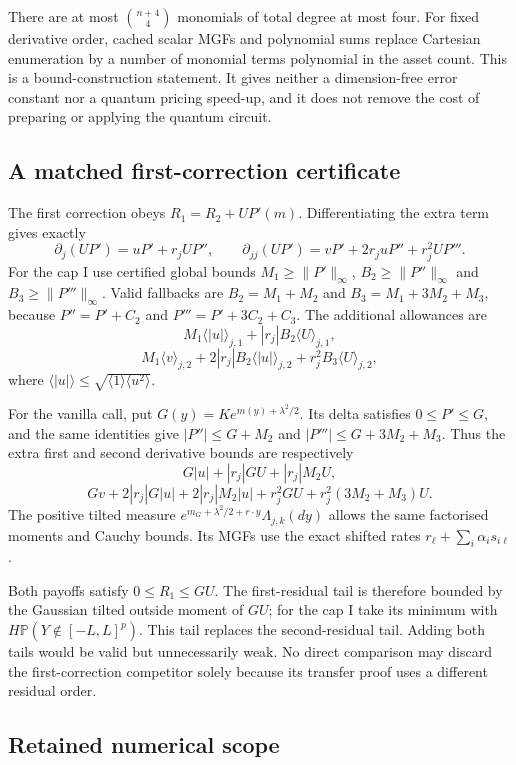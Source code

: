 There are at most $\binom{n+4}{4}$ monomials of total degree at most four.
For fixed derivative order, cached scalar MGFs and polynomial sums replace
Cartesian enumeration by a number of monomial terms polynomial in the
asset count. This is a bound-construction statement. It gives neither a
dimension-free error constant nor a quantum pricing speed-up, and it
does not remove the cost of preparing or applying the quantum circuit.

\subsection{A matched first-correction certificate}

The first correction obeys $R_1=R_2+UP'(m)$. Differentiating the extra
term gives exactly
\[
 \partial_j(UP')=uP'+r_jUP'',\qquad
 \partial_{jj}(UP')=vP'+2r_juP''+r_j^2UP'''.
\]
For the cap I use certified global bounds $M_1\geq\|P'\|_\infty$,
$B_2\geq\|P''\|_\infty$ and $B_3\geq\|P'''\|_\infty$. Valid
fallbacks are $B_2=M_1+M_2$ and $B_3=M_1+3M_2+M_3$, because
$P''=P'+C_2$ and $P'''=P'+3C_2+C_3$. The additional allowances are
\[
 M_1\langle|u|\rangle_{j,1}+|r_j|B_2\langle U\rangle_{j,1},
\]
\[
 M_1\langle v\rangle_{j,2}+2|r_j|B_2\langle|u|\rangle_{j,2}
                   +r_j^2B_3\langle U\rangle_{j,2},
\]
where $\langle|u|\rangle\leq
\sqrt{\langle1\rangle\langle u^2\rangle}$.

For the vanilla call, put $G(y)=K e^{m(y)+\lambda^2/2}$. Its delta
satisfies $0\leq P'\leq G$, and the same identities give
$|P''|\leq G+M_2$ and $|P'''|\leq G+3M_2+M_3$. Thus the extra
first and second derivative bounds are respectively
\[
 G|u|+|r_j|GU+|r_j|M_2U,
\]
\[
 Gv+2|r_j|G|u|+2|r_j|M_2|u|
             +r_j^2GU+r_j^2(3M_2+M_3)U.
\]
The positive tilted measure $e^{m_G+\lambda^2/2+r\cdot y}
\Lambda_{j,k}(dy)$ allows the same factorised moments and Cauchy bounds.
Its MGFs use the exact shifted rates $r_\ell+\sum_i\alpha_is_{i\ell}$.

Both payoffs satisfy $0\leq R_1\leq GU$. The first-residual tail is
therefore bounded by the Gaussian tilted outside moment of $GU$;
for the cap I take its minimum with $H\mathbb P(Y\notin[-L,L]^p)$.
This tail replaces the second-residual tail. Adding both tails would
be valid but unnecessarily weak. No direct comparison may discard the
first-correction competitor solely because its transfer proof uses a
different residual order.

\subsection{Retained numerical scope}

